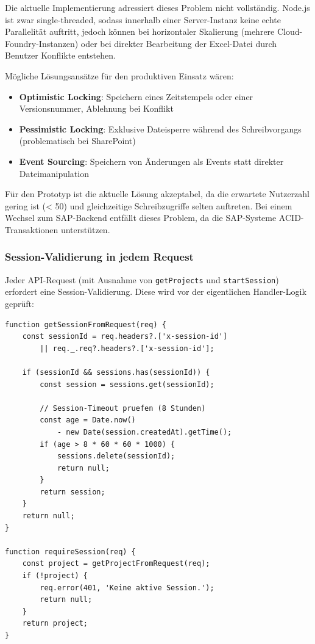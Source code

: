 Die aktuelle Implementierung adressiert dieses Problem nicht vollständig. Node.js ist zwar single-threaded, sodass innerhalb einer Server-Instanz keine echte Parallelität auftritt, jedoch können bei horizontaler Skalierung (mehrere Cloud-Foundry-Instanzen) oder bei direkter Bearbeitung der Excel-Datei durch Benutzer Konflikte entstehen.

Mögliche Lösungsansätze für den produktiven Einsatz wären:
\begin{itemize}
    \item \textbf{Optimistic Locking}: Speichern eines Zeitstempels oder einer Versionsnummer, Ablehnung bei Konflikt
    \item \textbf{Pessimistic Locking}: Exklusive Dateisperre während des Schreibvorgangs (problematisch bei SharePoint)
    \item \textbf{Event Sourcing}: Speichern von Änderungen als Events statt direkter Dateimanipulation
\end{itemize}

Für den Prototyp ist die aktuelle Lösung akzeptabel, da die erwartete Nutzerzahl gering ist (< 50) und gleichzeitige Schreibzugriffe selten auftreten. Bei einem Wechsel zum SAP-Backend entfällt dieses Problem, da die SAP-Systeme ACID-Transaktionen unterstützen.

\subsubsection{Session-Validierung in jedem Request}

Jeder API-Request (mit Ausnahme von \texttt{getProjects} und \texttt{startSession}) erfordert eine Session-Validierung. Diese wird vor der eigentlichen Handler-Logik geprüft:

\begin{lstlisting}[caption={Session-Validierung}, label={lst:session-validation}]
function getSessionFromRequest(req) {
    const sessionId = req.headers?.['x-session-id']
        || req._.req?.headers?.['x-session-id'];

    if (sessionId && sessions.has(sessionId)) {
        const session = sessions.get(sessionId);

        // Session-Timeout pruefen (8 Stunden)
        const age = Date.now()
            - new Date(session.createdAt).getTime();
        if (age > 8 * 60 * 60 * 1000) {
            sessions.delete(sessionId);
            return null;
        }
        return session;
    }
    return null;
}

function requireSession(req) {
    const project = getProjectFromRequest(req);
    if (!project) {
        req.error(401, 'Keine aktive Session.');
        return null;
    }
    return project;
}
\end{lstlisting}

